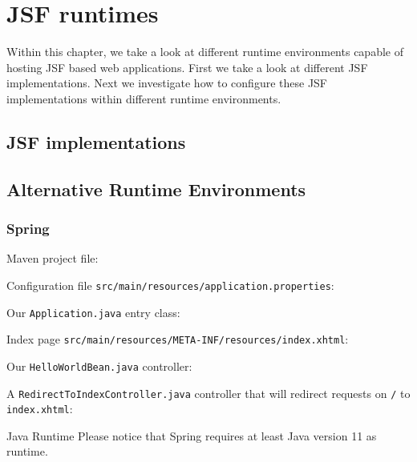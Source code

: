 %

\chapter{JSF runtimes}
Within this chapter, we take a look at different runtime environments capable of hosting JSF based web applications.
First we take a look at different JSF implementations.
Next we investigate how to configure these JSF implementations within different runtime environments.

\section{JSF implementations}

\section{Alternative Runtime Environments}

\subsection{Spring}

Maven project file:


Configuration file \texttt{src/main/resources/application.properties}:


Our \texttt{Application.java} entry class:


Index page \texttt{src/main/resources/META-INF/resources/index.xhtml}:


Our \texttt{HelloWorldBean.java} controller:


A \texttt{RedirectToIndexController.java} controller that will redirect requests on \texttt{/} to \texttt{index.xhtml}:


\begin{TIP}{Java Runtime}
	Please notice that Spring requires at least Java version 11 as runtime.
\end{TIP}

